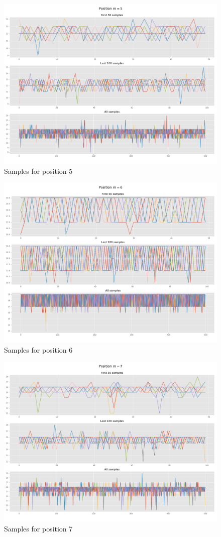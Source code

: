 \documentclass[]{article}
\begin{document}
	\begin{figure}[H]
		\begin{center}
			
			\includegraphics[width=.7\textwidth]{task4/figures/T_2_4/Q2/convergence_pos5.png}
			\caption*{Samples for position 5}
		\end{center}
	\end{figure}
	
	\begin{figure}[H]
		\begin{center}
			
			\includegraphics[width=.7\textwidth]{task4/figures/T_2_4/Q2/convergence_pos6.png}
			\caption*{Samples for position 6}
		\end{center}
	\end{figure}
	
	\begin{figure}[H]
		\begin{center}
			
			\includegraphics[width=.7\textwidth]{task4/figures/T_2_4/Q2/convergence_pos7.png}
			\caption*{Samples for position 7}
		\end{center}
	\end{figure}
	
\end{document}

